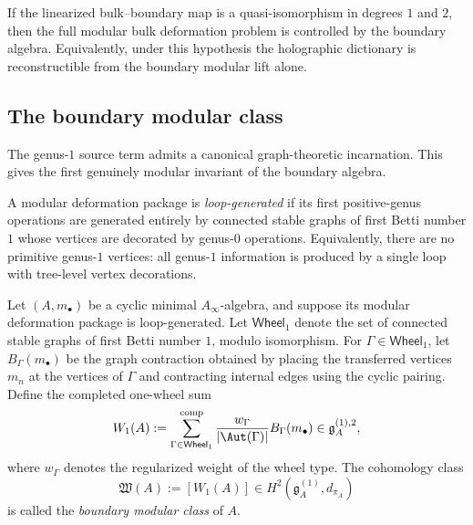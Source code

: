 \begin{corollary}
If the linearized bulk--boundary map is a quasi-isomorphism in degrees $1$ and $2$, then the
full modular bulk deformation problem is controlled by the boundary algebra. Equivalently,
under this hypothesis the holographic dictionary is reconstructible from the boundary modular
lift alone.
\end{corollary}

\subsection{The boundary modular class}

The genus-$1$ source term admits a canonical graph-theoretic incarnation. This gives the
first genuinely modular invariant of the boundary algebra.

\begin{definition}
A modular deformation package is \emph{loop-generated} if its first positive-genus operations
are generated entirely by connected stable graphs of first Betti number $1$ whose vertices are
decorated by genus-$0$ operations. Equivalently, there are no primitive genus-$1$ vertices:
all genus-$1$ information is produced by a single loop with tree-level vertex decorations.
\end{definition}

\begin{definition}
Let $(A,m_\bullet)$ be a cyclic minimal $A_\infty$-algebra, and suppose its modular
deformation package is loop-generated. Let $\mathsf{Wheel}_1$ denote the set of connected
stable graphs of first Betti number $1$, modulo isomorphism. For
$\Gamma\in\mathsf{Wheel}_1$, let $B_\Gamma(m_\bullet)$ be the graph contraction obtained by
placing the transferred vertices $m_n$ at the vertices of $\Gamma$ and contracting internal edges
using the cyclic pairing. Define the completed one-wheel sum
\begin{equation}
W_1(A):=
\sum_{\Gamma\in\mathsf{Wheel}_1}^{\mathrm{comp}}
\frac{w_\Gamma}{|\Aut(\Gamma)|}
B_\Gamma(m_\bullet)
\in \mathfrak g_A^{(1),2},
\end{equation}
where $w_\Gamma$ denotes the regularized weight of the wheel type. The cohomology class
\begin{equation}
\mathfrak W(A):=[W_1(A)]\in H^2(\mathfrak g_A^{(1)},d_{\pi_A})
\end{equation}
is called the \emph{boundary modular class} of $A$.
\end{definition}

